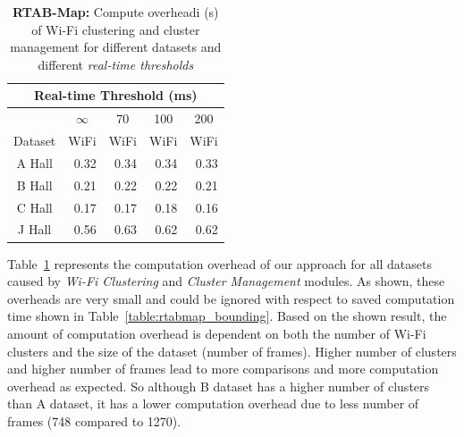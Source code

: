
\begin{table}
\caption{{\bf RTAB-Map:} Compute overheadi (s) of {Wi-Fi clustering} and {cluster management} for different datasets and different {\it real-time thresholds}}
\begin{center}
\begin{tabular}{| c | r | r | r | r | } 
\hline 
\multicolumn{5}{|c|}{Real-time Threshold (ms)} \\ 
\hline 
 & \multicolumn{1}{|c|}{$\infty$} & \multicolumn{1}{|c|}{70} & \multicolumn{1}{|c|}{100} & \multicolumn{1}{|c|}{200} \\ 
\hline 
 {Dataset} & \multicolumn{1}{|c|}{WiFi} & \multicolumn{1}{|c|}{WiFi} & \multicolumn{1}{|c|}{WiFi} & \multicolumn{1}{|c|}{WiFi} \\ 
\hline 
 A Hall & 0.32 & 0.34 & 0.34 & 0.33 \\ 
 B Hall & 0.21 & 0.22 & 0.22 & 0.21 \\ 
 C Hall & 0.17 & 0.17 & 0.18 & 0.16 \\ 
 J Hall & 0.56 & 0.63 & 0.62 & 0.62 \\ 
\hline 
\end{tabular} 
\label{table:rtabmap_overhead}
\end{center}
\end{table}
Table~\ref{table:rtabmap_overhead} represents the computation overhead of our approach for all datasets caused by {\it Wi-Fi Clustering} and {\it Cluster Management} modules. 
As shown, these overheads are very small and could be ignored with respect to saved computation time shown in Table~\ref{table:rtabmap_bounding}. 
Based on the shown result, the amount of computation overhead is dependent on both the number of Wi-Fi clusters and the size of the dataset (number of frames). 
Higher number of clusters and higher number of frames lead to more comparisons and more computation overhead as expected. 
So although B dataset has a higher number of clusters than A dataset, it has a lower computation overhead due to less number of frames (748 compared to 1270).


